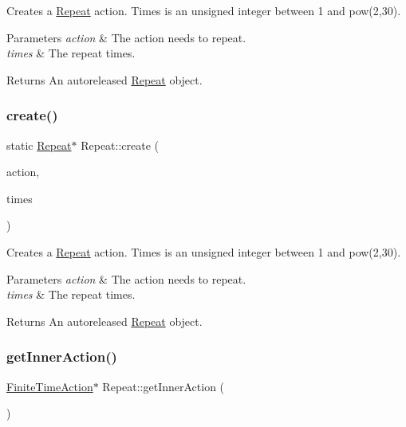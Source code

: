 Creates a \hyperlink{classRepeat}{Repeat} action. Times is an unsigned integer between 1 and pow(2,30).


\begin{DoxyParams}{Parameters}
{\em action} & The action needs to repeat. \\
\hline
{\em times} & The repeat times. \\
\hline
\end{DoxyParams}
\begin{DoxyReturn}{Returns}
An autoreleased \hyperlink{classRepeat}{Repeat} object. 
\end{DoxyReturn}
\mbox{\label{classRepeat_af428380a0173f262a3d470971c97fce1}} 
\subsubsection{\texorpdfstring{create()}{create()}\hspace{0.1cm}{\footnotesize\ttfamily [2/2]}}
{\footnotesize\ttfamily static \hyperlink{classRepeat}{Repeat}$\ast$ Repeat\+::create (\begin{DoxyParamCaption}\item[{\hyperlink{classFiniteTimeAction}{Finite\+Time\+Action} $\ast$}]{action,  }\item[{unsigned int}]{times }\end{DoxyParamCaption})\hspace{0.3cm}{\ttfamily [static]}}

Creates a \hyperlink{classRepeat}{Repeat} action. Times is an unsigned integer between 1 and pow(2,30).


\begin{DoxyParams}{Parameters}
{\em action} & The action needs to repeat. \\
\hline
{\em times} & The repeat times. \\
\hline
\end{DoxyParams}
\begin{DoxyReturn}{Returns}
An autoreleased \hyperlink{classRepeat}{Repeat} object. 
\end{DoxyReturn}
\mbox{\label{classRepeat_ad5fb2fc246a8ada68b97e0b3f3d64e30}} 
\subsubsection{\texorpdfstring{get\+Inner\+Action()}{getInnerAction()}\hspace{0.1cm}{\footnotesize\ttfamily [1/2]}}
{\footnotesize\ttfamily \hyperlink{classFiniteTimeAction}{Finite\+Time\+Action}$\ast$ Repeat\+::get\+Inner\+Action (\begin{DoxyParamCaption}{ }\end{DoxyParamCaption})\hspace{0.3cm}{\ttfamily [inline]}}

